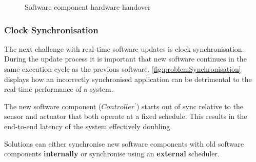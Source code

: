 \begin{figure}[ht]
    \caption[Software component hardware handover]
    {Software component hardware handover}
    \label{fig:problemHardwareHandover}
\end{figure}

\clearpage

\subsubsection{Clock Synchronisation} \label{sec:synchronisation}
The next challenge with real-time software updates is clock synchronisation. During the update process it is important that new software continues in the same execution cycle as the previous software. \autoref{fig:problemSynchronisation} displays how an incorrectly synchronised application can be detrimental to the real-time performance of a system.

The new software component ({$Controller^{\prime}$}) starts out of sync relative to the sensor and actuator that both operate at a fixed schedule. This results in the end-to-end latency of the system effectively doubling.

Solutions can either synchronise new software components with old software components \textbf{internally} or synchronise using an \textbf{external} scheduler.

